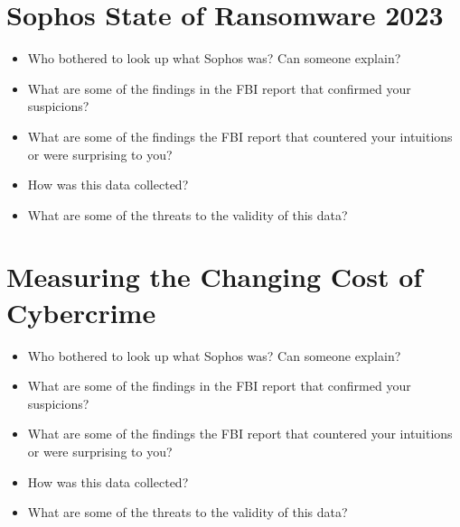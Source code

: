 \documentclass[11pt]{article}
\begin{document}
\section*{Sophos State of Ransomware 2023}

\begin{itemize}
    \item Who bothered to look up what Sophos was? Can someone explain?
    \item What are some of the findings in the FBI report that confirmed your suspicions?
    \item What are some of the findings the FBI report that countered your intuitions or were surprising to you? 
    \item How was this data collected?
    \item What are some of the threats to the validity of this data?
\end{itemize}

\section*{Measuring the Changing Cost of Cybercrime}

\begin{itemize}
    \item Who bothered to look up what Sophos was? Can someone explain?
    \item What are some of the findings in the FBI report that confirmed your suspicions?
    \item What are some of the findings the FBI report that countered your intuitions or were surprising to you? 
    \item How was this data collected?
    \item What are some of the threats to the validity of this data?
\end{itemize}
\end{document}
